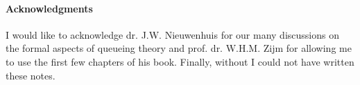 \paragraph{Acknowledgments}

I would like to acknowledge dr. J.W. Nieuwenhuis for our many
discussions on the formal aspects of queueing theory and
prof. dr. W.H.M. Zijm for allowing me to use the first few chapters of
his book. Finally, without 
\citet{el-taha98:_sampl_path_analy_queuein_system} I could not have
written these notes. 




